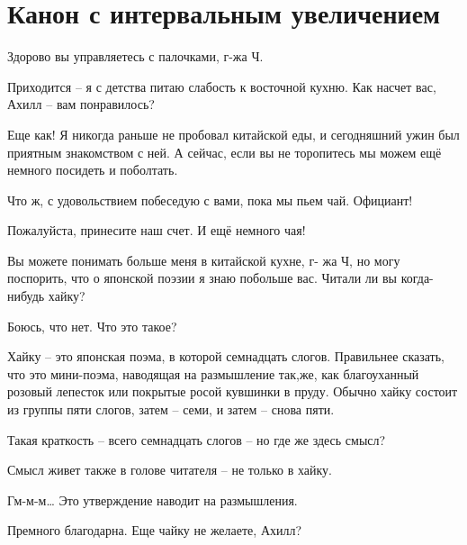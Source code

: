 \documentclass[../main.tex]{subfiles}
\begin{document}
\section{Канон с интервальным увеличением}


\begin{Dialogue}

 Здорово вы управляетесь с палочками, г-жа Ч.

 Приходится \--- я с детства питаю слабость к восточной кухню. Как насчет вас, Ахилл \--- вам понравилось?

 Еще как! Я никогда раньше не пробовал китайской еды, и сегодняшний ужин был приятным знакомством с ней. А сейчас, если вы не торопитесь мы можем ещё немного посидеть и поболтать.

 Что ж, с удовольствием побеседую с вами, пока мы пьем чай. Официант!


Пожалуйста, принесите наш счет. И ещё немного чая!


 Вы можете понимать больше меня в китайской кухне, г- жа Ч, но могу поспорить, что о японской поэзии я знаю побольше вас. Читали ли вы когда-нибудь хайку?

 Боюсь, что нет. Что это такое?

 Хайку \--- это японская поэма, в которой семнадцать слогов. Правильнее сказать, что это мини-поэма, наводящая на размышление так,же, как благоуханный розовый лепесток или покрытые росой кувшинки в пруду. Обычно хайку состоит из группы пяти слогов, затем \--- семи, и затем \--- снова пяти.

 Такая краткость \--- всего семнадцать слогов \--- но где же здесь смысл?

 Смысл живет также в голове читателя \--- не только в хайку.

 Гм-м-м\ldots{} Это утверждение наводит на размышления.


Премного благодарна. Еще чайку не желаете, Ахилл?


\end{Dialogue}
\end{document}
